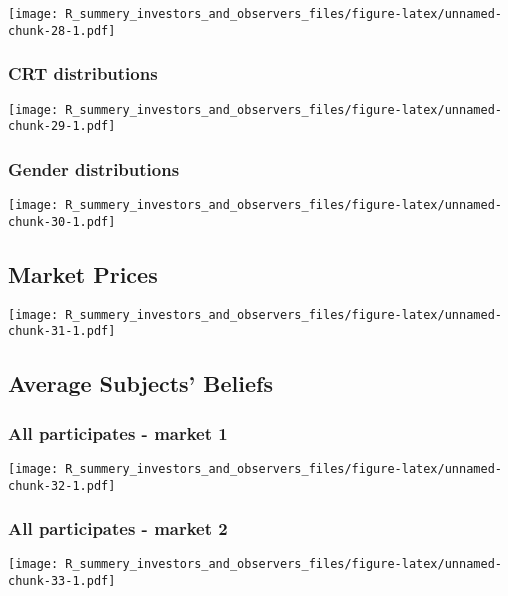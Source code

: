 \documentclass[]{article}
\begin{document}
\texttt{[image: R\_summery\_investors\_and\_observers\_files/figure-latex/unnamed-chunk-28-1.pdf]}

\hypertarget{crt-distributions-2}{%
\subsubsection{CRT distributions}\label{crt-distributions-2}}

\texttt{[image: R\_summery\_investors\_and\_observers\_files/figure-latex/unnamed-chunk-29-1.pdf]}

\hypertarget{gender-distributions-2}{%
\subsubsection{Gender distributions}\label{gender-distributions-2}}

\texttt{[image: R\_summery\_investors\_and\_observers\_files/figure-latex/unnamed-chunk-30-1.pdf]}

\hypertarget{market-prices-2}{%
\subsection{Market Prices}\label{market-prices-2}}

\texttt{[image: R\_summery\_investors\_and\_observers\_files/figure-latex/unnamed-chunk-31-1.pdf]}

\hypertarget{average-subjects-beliefs-2}{%
\subsection{Average Subjects'
Beliefs}\label{average-subjects-beliefs-2}}

\hypertarget{all-participates---market-1-2}{%
\subsubsection{All participates - market
1}\label{all-participates---market-1-2}}

\texttt{[image: R\_summery\_investors\_and\_observers\_files/figure-latex/unnamed-chunk-32-1.pdf]}

\hypertarget{all-participates---market-2-2}{%
\subsubsection{All participates - market
2}\label{all-participates---market-2-2}}

\texttt{[image: R\_summery\_investors\_and\_observers\_files/figure-latex/unnamed-chunk-33-1.pdf]}
\end{document}
